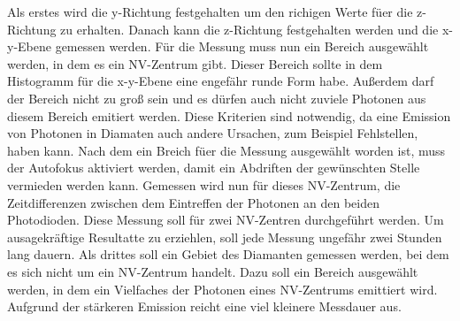 Als erstes wird die y-Richtung festgehalten um den richigen Werte f\"uer die z-Richtung zu erhalten. 
Danach kann die z-Richtung festgehalten werden und die x-y-Ebene gemessen werden. 
F\"ur die Messung muss nun ein Bereich ausgew\"ahlt werden, in dem es  ein NV-Zentrum gibt.  
Dieser Bereich sollte in dem Histogramm f\"ur die x-y-Ebene eine engef\"ahr runde Form habe. 
Au{\ss}erdem darf der Bereich nicht zu gro{\ss} sein und es d\"urfen auch nicht zuviele Photonen aus diesem Bereich emitiert werden. 
Diese Kriterien sind notwendig, da eine Emission von Photonen in Diamaten auch andere Ursachen, zum Beispiel Fehlstellen, haben kann. 
Nach dem ein Breich f\"uer die Messung ausgew\"ahlt worden ist, muss der Autofokus aktiviert werden, damit ein Abdriften der gew\"unschten Stelle vermieden werden kann. Gemessen wird nun f\"ur dieses NV-Zentrum, die Zeitdifferenzen zwischen dem Eintreffen der Photonen an den beiden Photodioden. 
Diese Messung soll f\"ur zwei NV-Zentren durchgef\"uhrt werden. 
Um ausagekr\"aftige Resultatte zu erziehlen, soll jede Messung ungef\"ahr zwei Stunden lang dauern. 
Als drittes soll ein Gebiet des Diamanten gemessen werden, bei dem es sich nicht um ein NV-Zentrum handelt. 
Dazu soll ein Bereich ausgew\"ahlt werden, in dem ein Vielfaches der Photonen eines NV-Zentrums emittiert wird. Aufgrund der stärkeren Emission reicht eine viel kleinere Messdauer aus. 


